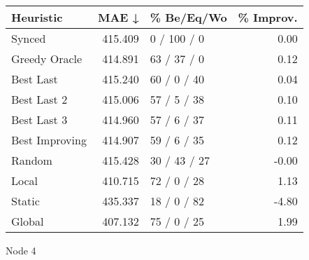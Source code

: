 \begin{tabular}{lrlr}
\toprule
\textbf{Heuristic} & \textbf{MAE ↓} & \textbf{\% Be/Eq/Wo} & \textbf{\% Improv.} \\
\midrule
            Synced &        415.409 &          0 / 100 / 0 &                0.00 \\
     Greedy Oracle &        414.891 &          63 / 37 / 0 &                0.12 \\
         Best Last &        415.240 &          60 / 0 / 40 &                0.04 \\
       Best Last 2 &        415.006 &          57 / 5 / 38 &                0.10 \\
       Best Last 3 &        414.960 &          57 / 6 / 37 &                0.11 \\
    Best Improving &        414.907 &          59 / 6 / 35 &                0.12 \\
            Random &        415.428 &         30 / 43 / 27 &               -0.00 \\
             Local &        410.715 &          72 / 0 / 28 &                1.13 \\
            Static &        435.337 &          18 / 0 / 82 &               -4.80 \\
            Global &        407.132 &          75 / 0 / 25 &                1.99 \\
\bottomrule
\end{tabular}
\caption{Node 4}
\label{tab:non_lr01_le1_bs4_4}
